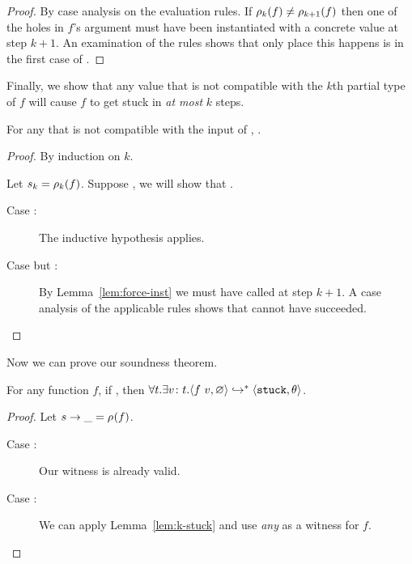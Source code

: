 \begin{proof}
  By case analysis on the evaluation rules. 
  If $\rho_{k}(f) \neq \rho_{k+1}(f)$ then one of the holes in $f$'s
  argument must have been instantiated with a concrete value at step
  $k+1$.
  An examination of the rules shows that only place this happens is 
  in the first case of \forcesym.
\end{proof}
%
Finally, we show that any value that is not compatible with the $k$th
partial type of $f$ will cause $f$ to get stuck in \emph{at most} $k$
steps.
%
\begin{lem}
\label{lem:k-stuck}
  For any  that is not compatible with
  the input of , .
\end{lem}
\begin{proof}
  By induction on $k$.
  
  Let $s_k = \rho_{k}(f)$. Suppose , we
  will show that .
  \begin{description}
  \item[Case :] 
    The inductive hypothesis applies.
  \item[Case  but :] 
    By Lemma~\ref{lem:force-inst} we must have called \forcesym at step
    $k+1$. 
    A case analysis of the applicable rules shows that \forcesym cannot
    have succeeded.
  \end{description}
\end{proof}
%
Now we can prove our soundness theorem.
%
\begin{thm}
\label{thm:soundness}
  For any function $f$, if ,
  then $\forall t. \exists {v} \colon {t}. \langle f \ v, \varnothing \rangle \hookrightarrow^{*} \langle \mathtt{stuck}, \theta \rangle$.
\end{thm}
\begin{proof}
  Let ${s} \rightarrow \_ = \rho_{}(f)$.
  \begin{description}
  \item[Case :] Our witness is already valid.
  \item[Case :] We can apply Lemma~\ref{lem:k-stuck} and
    use \emph{any}  as a witness for $f$.
  \end{description}
\end{proof}



